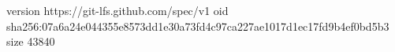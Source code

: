 version https://git-lfs.github.com/spec/v1
oid sha256:07a6a24e044355e8573dd1e30a73fd4c97ca227ae1017d1ec17fd9b4ef0bd5b3
size 43840

